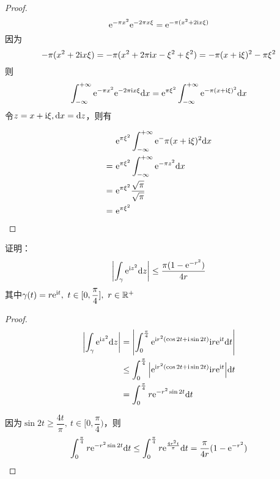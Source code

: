 \begin{proof}

    $$\mathrm{e}^{-\pi x^2}\mathrm{e}^{-2\pi x\xi} = \mathrm{e}^{-\pi(x^2 + 2\mathrm{i} x\xi)}$$
    因为
    $$-\pi(x^2 + 2\mathrm{i} x\xi) = -\pi (x^2 + 2\pi\mathrm{i} x - \xi^2 + \xi^2) = -\pi(x + \mathrm{i} \xi)^2 - \pi\xi^2$$
    则
    $$\int_{-\infty}^{+\infty}{\mathrm{e}^{-\pi x^2}\mathrm{e}^{-2\pi \mathrm{i} x\xi}}\mathrm{d} x = \mathrm{e}^{\pi\xi^2} \int_{-\infty}^{+\infty}{\mathrm{e}^{-\pi (x+\mathrm{i}\xi)^2}}\mathrm{d} x$$
    令$z = x + \mathrm{i}\xi, \mathrm{d} x = \mathrm{d} z$，则有

    \begin{align*}
        &\mathrm{e}^{\pi\xi^2} \int_{-\infty}^{+\infty}{\mathrm{e}^-{\pi (x+\mathrm{i}\xi)^2}}\mathrm{d} x \\
        = \ & \mathrm{e}^{\pi\xi^2} \int_{-\infty}^{+\infty}{\mathrm{e}^{-\pi z^2}}\mathrm{d} x \\
        = \ & \mathrm{e}^{\pi\xi^2} \dfrac{\sqrt{\pi}}{\sqrt{\pi}} \\
        = \ & \mathrm{e}^{\pi\xi^2}
    \end{align*}

\end{proof}

\begin{proposition}

    证明：
    $$\left| \int_{\gamma}{\mathrm{e}^{\mathrm{i} z^2}}\mathrm{d} z \right| \leq \dfrac{\pi(1 - \mathrm{e}^{-r^2})}{4r}$$
    其中$\gamma(t) = r\mathrm{e}^{\mathrm{i} t},\ t\in[0,\dfrac{\pi}{4}],\ r \in \mathbb{R}^+$

\end{proposition}

\begin{proof}

    \begin{align*}
        \left| \int_{\gamma}{\mathrm{e}^{\mathrm{i} z^2}}\mathrm{d} z \right| & = \left| \int_{0}^{\frac{\pi}{4}}{\mathrm{e}^{\mathrm{i} r^2(\cos{2t} + \mathrm{i}\sin{2t})}\mathrm{i} r\mathrm{e}^{\mathrm{i} t}}\mathrm{d} t \right| \\
        & \leq \int_{0}^{\frac{\pi}{4}}{\left| \mathrm{e}^{\mathrm{i} r^2(\cos{2t} + \mathrm{i}\sin{2t})}\mathrm{i} r\mathrm{e}^{\mathrm{i} t} \right|}\mathrm{d} t \\
        & = \int_{0}^{\frac{\pi}{4}}{r\mathrm{e}^{-r^2\sin{2t}}}\mathrm{d} t
    \end{align*}

    因为$\sin{2t} \geq \dfrac{4t}{\pi}, \ t \in [0,\dfrac{\pi}{4})$，则
    $$\int_{0}^{\frac{\pi}{4}}{r\mathrm{e}^{-r^2\sin{2t}}}\mathrm{d} t \leq \int_{0}^{\frac{\pi}{4}}{r\mathrm{e}^{\frac{4r^2t}{\pi}}}\mathrm{d} t = \dfrac{\pi}{4r}(1 - \mathrm{e}^{-r^2}) $$

\end{proof}


